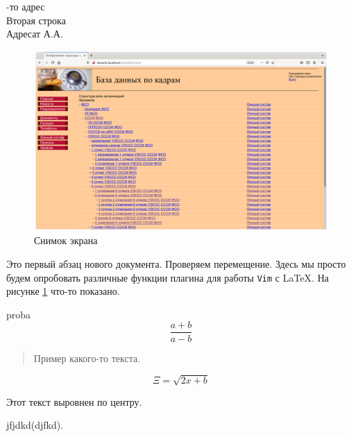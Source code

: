 \documentclass[a4paper]{article}
\begin{document}
\hfill
\parbox{75mm}{-то адрес\\Вторая строка\\[3mm]Адресат А.А.}
	
\begin{figure}[t]
	\centering
	\includegraphics[width=\textwidth]{Screenshot.png}
	\caption{Снимок экрана}
	\label{fig:screenshot}
\end{figure}

Это первый абзац нового документа. Проверяем перемещение. Здесь мы просто будем опробовать различные функции 
плагина для работы \texttt{Vim} с \LaTeX.
На рисунке \ref{fig:screenshot} что-то показано. 

proba 
$$\frac{a+b}{a-b}$$
\begin{quote}
  Пример какого-то текста.
\end{quote}
\begin{equation}
   \Xi = \sqrt{2x+b} 
  \label{equation}
\end{equation}
\begin{center}
	Этот текст выровнен по центру.
\end{center}
jfjdkd(djfkd).
\end{document}
